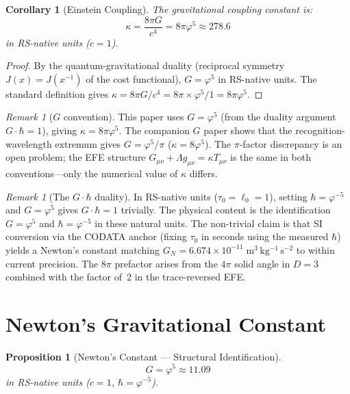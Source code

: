 \documentclass[12pt,a4paper]{article}
\newtheorem{corollary}[theorem]{Corollary}
\newtheorem{proposition}[theorem]{Proposition}
\theoremstyle{definition}
\theoremstyle{remark}
\newtheorem{remark}[theorem]{Remark}
\begin{document}
\begin{corollary}[Einstein Coupling]
\label{thm:kappa}
The gravitational coupling constant is:
\begin{equation}
  \kappa = \frac{8\pi G}{c^4}
  = 8\pi\varphi^5 \approx 278.6
\end{equation}
in RS-native units ($c = 1$).
\end{corollary}

\begin{proof}
By the quantum-gravitational duality (reciprocal symmetry
$J(x) = J(x^{-1})$ of the cost functional), $G = \varphi^5$
in RS-native units.  The standard definition gives
$\kappa = 8\pi G/c^4 = 8\pi \times \varphi^5 / 1
= 8\pi\varphi^5$.
\end{proof}

\begin{remark}[$G$ convention]
\label{rem:G-convention}
This paper uses $G = \varphi^5$ (from the duality argument
$G \cdot \hbar = 1$), giving $\kappa = 8\pi\varphi^5$.
The companion $G$ paper shows that the recognition-wavelength
extremum gives $G = \varphi^5/\pi$
($\kappa = 8\varphi^5$).  The
$\pi$-factor discrepancy is an open problem; the EFE
structure $G_{\mu\nu} + \Lambda g_{\mu\nu} = \kappa
T_{\mu\nu}$ is the same in both conventions---only the
numerical value of $\kappa$ differs.
\end{remark}

\begin{remark}[The $G \cdot \hbar$ duality]
\label{rem:duality}
In RS-native units ($\tau_0 = \ell_0 = 1$), setting
$\hbar = \varphi^{-5}$ and $G = \varphi^5$ gives
$G \cdot \hbar = 1$ trivially.  The physical content is
the identification $G = \varphi^5$ and
$\hbar = \varphi^{-5}$ in these natural units.  The
non-trivial claim is that SI conversion via the CODATA
anchor (fixing $\tau_0$ in seconds using the measured
$\hbar$) yields a Newton's constant matching
$G_N = 6.674 \times 10^{-11}\;\mathrm{m^3\,kg^{-1}\,s^{-2}}$
to within current precision.  The $8\pi$ prefactor arises
from the $4\pi$ solid angle in $D = 3$ combined with
the factor of~$2$ in the trace-reversed EFE.
\end{remark}

\section{Newton's Gravitational Constant}
\label{sec:G}

\begin{proposition}[Newton's Constant --- Structural Identification]
\label{thm:G}
\begin{equation}
  G = \varphi^5 \approx 11.09
\end{equation}
in RS-native units ($c = 1$, $\hbar = \varphi^{-5}$).
\end{proposition}
\end{document}
